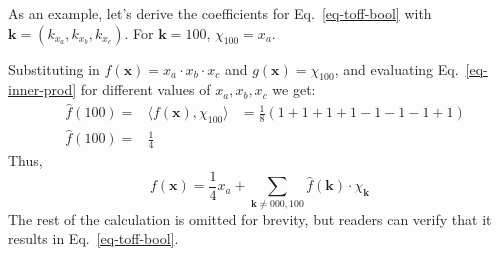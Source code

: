 \begin{example}
As an example, let's derive the coefficients for Eq.~\ref{eq-toff-bool} with $\mathbf{k} = (k_{x_a}, k_{x_b}, k_{x_c})$.
For $\mathbf{k} = 100$, $\chi_{100} = x_a$.


Substituting in $f(\mathbf{x})=x_a \cdot x_b \cdot x_c$ and $g(\mathbf{x})=\chi_{100}$, and evaluating Eq.~\ref{eq-inner-prod} for different values of $x_a,x_b,x_c$ we get:
\begin{align}
  &\hat{f}(100) =& \langle f(\mathbf{x}), \chi_{100} \rangle &= \frac{1}{8} ( 1 + 1 + 1 + 1 - 1 - 1 - 1 + 1 ) \\
  &\hat{f}(100) =& \frac{1}{4}\nonumber &
\end{align}
Thus,
\begin{equation}
  f(\mathbf{x}) = \frac{1}{4}x_a + \sum_{\mathbf{k} \neq 000,100} \hat{f}(\mathbf{k}) \cdot \chi_{\mathbf{k}}
\end{equation}
The rest of the calculation is omitted for brevity, but readers can verify that it results in Eq.~\ref{eq-toff-bool}.
\end{example}

